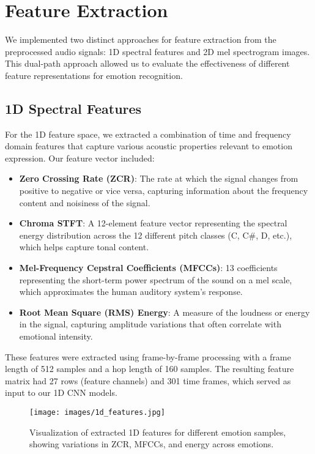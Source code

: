 \section{Feature Extraction}

We implemented two distinct approaches for feature extraction from the preprocessed audio signals: 1D spectral features and 2D mel spectrogram images. This dual-path approach allowed us to evaluate the effectiveness of different feature representations for emotion recognition.

\subsection{1D Spectral Features}

For the 1D feature space, we extracted a combination of time and frequency domain features that capture various acoustic properties relevant to emotion expression. Our feature vector included:

\begin{itemize}
    \item \textbf{Zero Crossing Rate (ZCR)}: The rate at which the signal changes from positive to negative or vice versa, capturing information about the frequency content and noisiness of the signal.
    
    \item \textbf{Chroma STFT}: A 12-element feature vector representing the spectral energy distribution across the 12 different pitch classes (C, C\#, D, etc.), which helps capture tonal content.
    
    \item \textbf{Mel-Frequency Cepstral Coefficients (MFCCs)}: 13 coefficients representing the short-term power spectrum of the sound on a mel scale, which approximates the human auditory system's response.
    
    \item \textbf{Root Mean Square (RMS) Energy}: A measure of the loudness or energy in the signal, capturing amplitude variations that often correlate with emotional intensity.
\end{itemize}

These features were extracted using frame-by-frame processing with a frame length of 512 samples and a hop length of 160 samples. The resulting feature matrix had 27 rows (feature channels) and 301 time frames, which served as input to our 1D CNN models.

\begin{figure}[h]
    \centering
    \texttt{[image: images/1d\_features.jpg]}
    \caption{Visualization of extracted 1D features for different emotion samples, showing variations in ZCR, MFCCs, and energy across emotions.}
    \label{fig:1d_features}
\end{figure}


